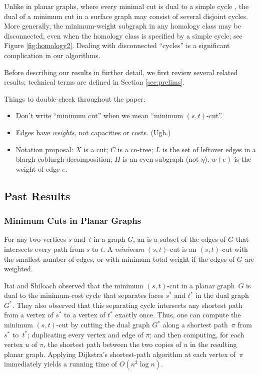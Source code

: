 \documentclass[11pt,twoside]{article}
\begin{document}
Unlike in planar graphs, where every minimal cut is  dual to a simple cycle \cite{w-pg-33}, the dual of a minimum cut in a surface graph may consist of several disjoint cycles.  More generally, the minimum-weight subgraph in any homology class may be disconnected, even when the homology class is specified by a simple cycle; see Figure \ref{fig:homology2}.  Dealing with disconnected “cycles” is a significant complication in our algorithms.

Before describing our results in further detail, we first review several related results; technical terms are defined in Section \ref{sec:prelims}.

\begin{TODO}
\noindent
Things to double-check throughout the paper:
\begin{itemize}\itemsep0pt
\item
Don't write “minimum cut” when we mean “minimum $(s,t)$-cut”.
\item
Edges have \emph{weights}, not capacities or costs.  (Ugh.)
\item
Notation proposal: $X$ is a cut; $C$ is a co-tree; $L$ is the set of leftover edges in a blargh-coblurgh decomposition; $H$ is an even subgraph (not $\eta$).  $w(e)$ is the weight of edge $e$.
\end{itemize}
\end{TODO}

\subsection{Past Results}

\subsubsection*{Minimum Cuts in Planar Graphs}

For any two vertices $s$ and~$t$ in a graph $G$, an  is a subset of the edges of $G$ that intersects every path from $s$ to $t$.  A \emph{minimum} $(s,t)$-cut is an $(s,t)$-cut with the smallest number of edges, or with minimum total weight if the edges of $G$ are weighted.

Itai and Shiloach \cite{is-mfpn-79} observed that the minimum $(s,t)$-cut in a planar graph~$G$ is dual to the minimum-cost cycle that separates faces $s^*$ and $t^*$ in the dual graph $G^*$.  They also observed that this separating cycle intersects any shortest path from a vertex of $s^*$ to a vertex of $t^*$ exactly once.  Thus, one can compute the minimum $(s,t)$-cut by cutting the dual graph $G^*$ along a shortest path~$\pi$ from $s^*$ to~$t^*$; duplicating every vertex and edge of $\pi$; and then computing, for each vertex $u$ of $\pi$, the shortest path between the two copies of $u$ in the resulting planar graph.  Applying Dijkstra's shortest-path algorithm at each vertex of~$\pi$ immediately yields a running time of $O(n^2\log n)$.
\end{document}

